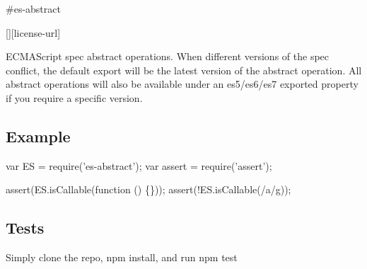 \#es-\/abstract \textsuperscript{\href{https://npmjs.org/package/es-abstract}{\tt }}

\href{https://travis-ci.org/ljharb/es-abstract}{\tt } \href{https://david-dm.org/ljharb/es-abstract}{\tt } \href{https://david-dm.org/ljharb/es-abstract#info=devDependencies}{\tt } \mbox{[}\mbox{]}\mbox{[}license-\/url\mbox{]} \href{http://npm-stat.com/charts.html?package=es-abstract}{\tt }

\href{https://npmjs.org/package/es-abstract}{\tt }

\href{https://ci.testling.com/ljharb/es-abstract}{\tt }

E\+C\+M\+A\+Script spec abstract operations. When different versions of the spec conflict, the default export will be the latest version of the abstract operation. All abstract operations will also be available under an {\ttfamily es5}/{\ttfamily es6}/{\ttfamily es7} exported property if you require a specific version.

\subsection*{Example}


\begin{DoxyCode}
var ES = require('es-abstract');
var assert = require('assert');

assert(ES.isCallable(function () \{\}));
assert(!ES.isCallable(/a/g));
\end{DoxyCode}


\subsection*{Tests}

Simply clone the repo, {\ttfamily npm install}, and run {\ttfamily npm test} 